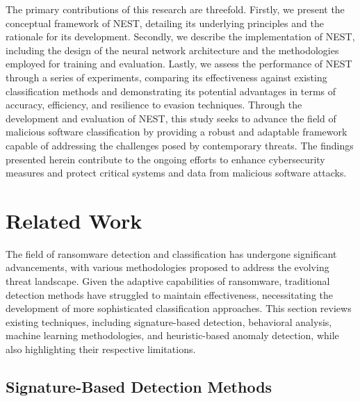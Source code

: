 \documentclass[lettersize,journal]{IEEEtran}
\begin{document}
The primary contributions of this research are threefold. Firstly, we present the conceptual framework of NEST, detailing its underlying principles and the rationale for its development. Secondly, we describe the implementation of NEST, including the design of the neural network architecture and the methodologies employed for training and evaluation. Lastly, we assess the performance of NEST through a series of experiments, comparing its effectiveness against existing classification methods and demonstrating its potential advantages in terms of accuracy, efficiency, and resilience to evasion techniques. Through the development and evaluation of NEST, this study seeks to advance the field of malicious software classification by providing a robust and adaptable framework capable of addressing the challenges posed by contemporary threats. The findings presented herein contribute to the ongoing efforts to enhance cybersecurity measures and protect critical systems and data from malicious software attacks.



\section{Related Work}

The field of ransomware detection and classification has undergone significant advancements, with various methodologies proposed to address the evolving threat landscape. Given the adaptive capabilities of ransomware, traditional detection methods have struggled to maintain effectiveness, necessitating the development of more sophisticated classification approaches. This section reviews existing techniques, including signature-based detection, behavioral analysis, machine learning methodologies, and heuristic-based anomaly detection, while also highlighting their respective limitations.

\subsection{Signature-Based Detection Methods}
\end{document}
